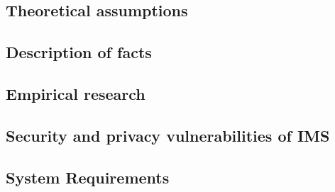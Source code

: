 
\subsection{Theoretical assumptions}\label{subsec:theoretical-assumptions}


\subsection{Description of facts}\label{subsec:description-of-facts}


\subsection{Empirical research}\label{subsec:empirical-research}


\subsection{Security and privacy vulnerabilities of IMS}\label{subsec:security-and-privacy-vulnerabilities-of-ims}


\subsection{System Requirements}\label{subsec:system-requirements}


